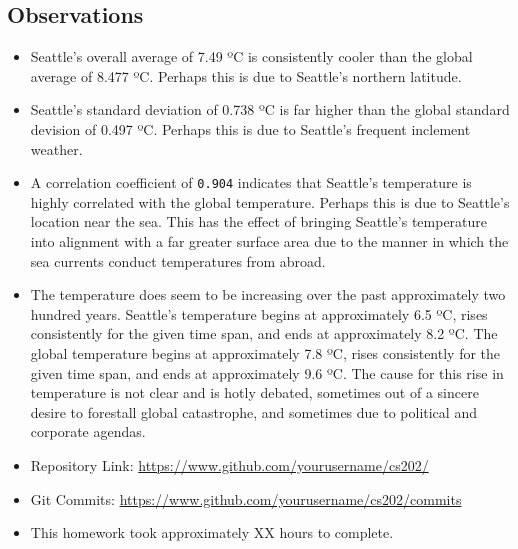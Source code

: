 \documentclass[12pt]{article}
\begin{document}
\subsection{Observations}

\begin{itemize}
    \item Seattle's overall average of 7.49 ºC is consistently cooler than the global average of 8.477 ºC. Perhaps this is due to Seattle's northern latitude.
    \item Seattle's standard deviation of 0.738 ºC is far higher than the global standard devision of 0.497 ºC. Perhaps this is due to Seattle's frequent inclement weather.
    \item A correlation coefficient of \lstinline{0.904} indicates that Seattle's temperature is highly correlated with the global temperature. Perhaps this is due to Seattle's location near the sea. This has the effect of bringing Seattle's temperature into alignment with a far greater surface area due to the manner in which the sea currents conduct temperatures from abroad.
    \item The temperature does seem to be increasing over the past approximately two hundred years. Seattle's temperature begins at approximately 6.5 ºC, rises consistently for the given time span, and ends at approximately 8.2 ºC. The global temperature begins at approximately 7.8 ºC, rises consistently for the given time span, and ends at approximately 9.6 ºC. The cause for this rise in temperature is not clear and is hotly debated, sometimes out of a sincere desire to forestall global catastrophe, and sometimes due to political and corporate agendas.
\end{itemize}


\iffalse


\begin{itemize}
\item Repository Link:
\url{https://www.github.com/yourusername/cs202/}

\item Git Commits:
\url{https://www.github.com/yourusername/cs202/commits}


\item This homework took approximately XX hours to complete.
\end{itemize}
\end{document}
